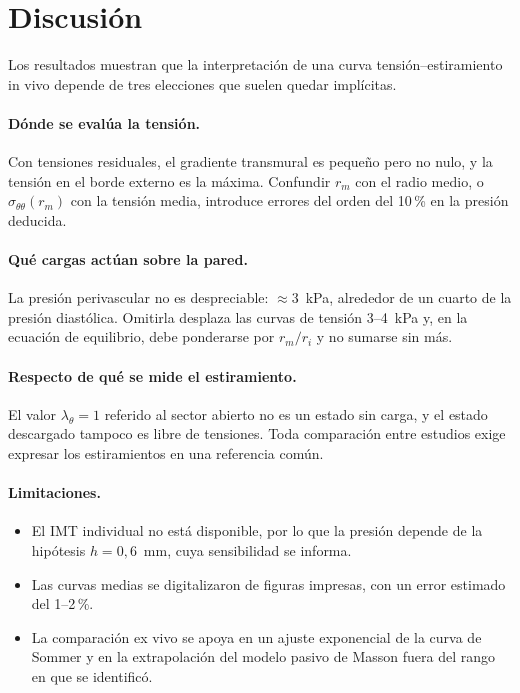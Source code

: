 \documentclass[11pt,a4paper]{article}
\newcommand{\stt}{\sigma_{\theta\theta}}
\newcommand{\lt}{\lambda_\theta}
\begin{document}
\section{Discusión}
Los resultados muestran que la interpretación de una curva tensión--estiramiento in vivo depende de tres elecciones que suelen quedar implícitas.

\paragraph{Dónde se evalúa la tensión.} Con tensiones residuales, el gradiente transmural es pequeño pero no nulo, y la tensión en el borde externo es la máxima. Confundir $r_m$ con el radio medio, o $\stt(r_m)$ con la tensión media, introduce errores del orden del 10\,\% en la presión deducida.

\paragraph{Qué cargas actúan sobre la pared.} La presión perivascular no es despreciable: $\approx3$~kPa, alrededor de un cuarto de la presión diastólica. Omitirla desplaza las curvas de tensión 3--4~kPa y, en la ecuación de equilibrio, debe ponderarse por $r_m/r_i$ y no sumarse sin más.

\paragraph{Respecto de qué se mide el estiramiento.} El valor $\lt=1$ referido al sector abierto no es un estado sin carga, y el estado descargado tampoco es libre de tensiones. Toda comparación entre estudios exige expresar los estiramientos en una referencia común.

\paragraph{Limitaciones.}
\begin{itemize}
\item El IMT individual no está disponible, por lo que la presión depende de la hipótesis $h=0{,}6$~mm, cuya sensibilidad se informa.
\item Las curvas medias se digitalizaron de figuras impresas, con un error estimado del 1--2\,\%.
\item La comparación ex vivo se apoya en un ajuste exponencial de la curva de Sommer y en la extrapolación del modelo pasivo de Masson fuera del rango en que se identificó.
\end{itemize}
\end{document}
